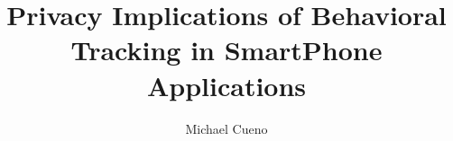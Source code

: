\documentclass[12pt]{article}
\title{Privacy Implications of Behavioral Tracking in SmartPhone Applications}
\author{Michael Cueno}
\date{}
\begin{document}
\maketitle

\abstract{ 
}

\pagebreak
\tableofcontents

\pagebreak

%
%












\end{document}
